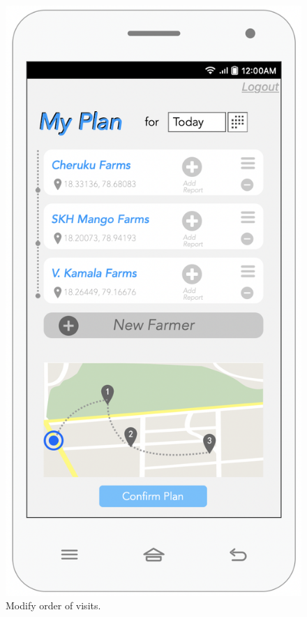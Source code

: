 \begin{multicols}{2}
\begin{figure}[H]
\centering
\includegraphics[scale=0.5]{../images_diagrams/mock_ups/dd/Plan02_ChangeOrder.png}
\caption{\label{fig:mockplan_reorder}Modify order of visits.}
\end{figure}
\end{multicols}

